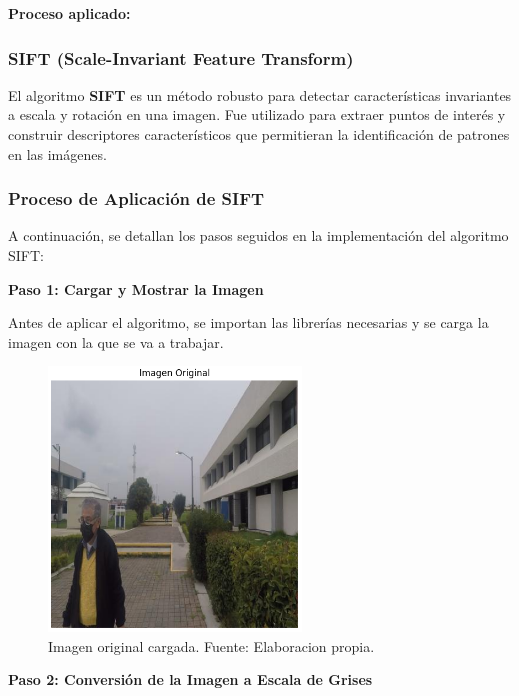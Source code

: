 \documentclass[a4paper]{article}
\begin{document}
\textbf{Proceso aplicado:}


\subsubsection{SIFT (Scale-Invariant Feature Transform)}

El algoritmo \textbf{SIFT} es un método robusto para detectar características invariantes a escala y rotación en una imagen. Fue utilizado para extraer puntos de interés y construir descriptores característicos que permitieran la identificación de patrones en las imágenes.

\subsubsection{Proceso de Aplicación de SIFT}

A continuación, se detallan los pasos seguidos en la implementación del algoritmo SIFT:
\par\vspace{0.5cm}

\textbf{Paso 1: Cargar y Mostrar la Imagen}
\par\vspace{0.5cm}

Antes de aplicar el algoritmo, se importan las librerías necesarias y se carga la imagen con la que se va a trabajar.

\begin{figure}[H]
    \centering
    \includegraphics[width=0.6\textwidth]{images/sift_paso_1.png}
    \caption{Imagen original cargada. Fuente: Elaboracion propia.}
\end{figure}

\textbf{Paso 2: Conversión de la Imagen a Escala de Grises}
\end{document}
